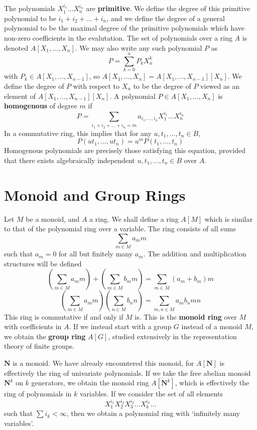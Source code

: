 The polynomials $X_1^{i_1} \dots X_n^{i_n}$ are {\bf primitive}. We define the degree of this primitive polynomial to be $i_1 + i_2 + \dots + i_n$, and we define the degree of a general polynomial to be the maximal degree of the primitive polynomials which have non-zero coefficients in the evalutation. The set of polynomials over a ring $A$ is denoted $A[X_1, \dots, X_n]$. We may also write any such polynomial $P$ as
%
\[ P = \sum_{k=0}^n P_k X_n^k \]
%
with $P_k \in A[X_1, \dots, X_{n-1}]$, so $A[X_1, \dots, X_n] = A[X_1, \dots, X_{n-1}][X_n]$. We define the degree of $P$ with respect to $X_n$ to be the degree of $P$ viewed as an element of $A[X_1, \dots, X_{n-1}][X_n]$. A polynomial $P \in A[X_1, \dots, X_n]$ is {\bf homogenous} of degree $m$ if
%
\[ P = \sum_{i_1 + i_2 + \dots + i_n = m} a_{i_1, \dots, i_n} X_1^{i_1} \dots X_n^{i_n} \]
%
In a commutative ring, this implies that for any $u,t_1, \dots, t_n \in B$,
%
\[ P(ut_1, \dots, ut_n) = u^m P(t_1, \dots, t_n) \]
%
Homogenous polynomials are precisely those satisfying this equation, provided that there exists algebraically independent $u, t_1, \dots, t_n \in B$ over $A$.





\section{Monoid and Group Rings}

Let $M$ be a monoid, and $A$ a ring. We shall define a ring $A[M]$ which is similar to that of the polynomial ring over a variable. The ring consists of all sums
%
\[ \sum_{m \in M} a_m m \]
%
such that $a_m = 0$ for all but finitely many $a_m$. The addition and multiplication structures will be defined
%
\[ \left( \sum_{m \in M} a_m m \right) + \left( \sum_{m \in M} b_m m \right) = \sum_{m \in M} (a_m + b_m) m \]
%
\[ \left( \sum_{m \in M} a_m m \right) \left( \sum_{n \in M} b_n n \right) = \sum_{m,n \in M} a_m b_n m n \]
%
This ring is commutative if and only if $M$ is. This is the {\bf monoid ring} over $M$ with coefficients in $A$. If we instead start with a group $G$ instead of a monoid $M$, we obtain the {\bf group ring} $A[G]$, studied extensively in the representation theory of finite groups.

\begin{example}
    $\mathbf{N}$ is a monoid. We have already encountered this monoid, for $A[\mathbf{N}]$ is effectively the ring of univariate polynomials. If we take the free abelian monoid $\mathbf{N}^k$ on $k$ generators, we obtain the monoid ring $A[\mathbf{N}^k]$, which is effectively the ring of polynomials in $k$ variables. If we consider the set of all elements
    \[ X_1^{i_1} X_2^{i_2} X_3^{i_2} \dots X_k^{i_k} \dots \]
    such that $\sum i_k < \infty$, then we obtain a polynomial ring with `infinitely many variables'.
\end{example}



